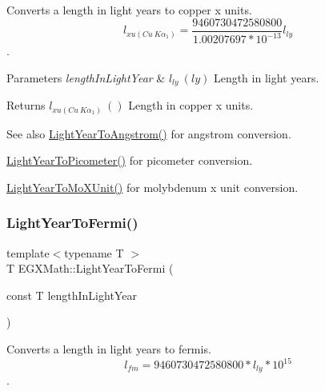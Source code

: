 Converts a length in light years to copper x units. \[ l_{xu(Cu\ K\alpha_1)}= \frac{9460730472580800}{1.00207697*10^{-13}} l_{ly}\]. 


\begin{DoxyParams}{Parameters}
{\em length\+In\+Light\+Year} & $ l_{ly}\ (ly)$ Length in light years. \\
\hline
\end{DoxyParams}
\begin{DoxyReturn}{Returns}
$ l_{xu(Cu\ K\alpha_1)}\ ()$ Length in copper x units. 
\end{DoxyReturn}
\begin{DoxySeeAlso}{See also}
\mbox{\hyperlink{group___e_g_x_math-_conversions-_length_conversions-_astronomical-_light_year-_non-_s_i_ga09634a7c514e3a0f573e7c171a791f78}{Light\+Year\+To\+Angstrom()}} for angstrom conversion. 

\mbox{\hyperlink{group___e_g_x_math-_conversions-_length_conversions-_astronomical-_light_year-_s_i_ga6dc5dc3c9584f578c4a935552fb965b7}{Light\+Year\+To\+Picometer()}} for picometer conversion. 

\mbox{\hyperlink{group___e_g_x_math-_conversions-_length_conversions-_astronomical-_light_year-_non-_s_i_gac275191181b93d118ec2b21cf09ff356}{Light\+Year\+To\+Mo\+X\+Unit()}} for molybdenum x unit conversion. 
\end{DoxySeeAlso}
\mbox{\label{group___e_g_x_math-_conversions-_length_conversions-_astronomical-_light_year-_non-_s_i_gaf3a2acd1e1653e2cecd6c299abe78524}} 
\subsubsection{\texorpdfstring{Light\+Year\+To\+Fermi()}{LightYearToFermi()}}
{\footnotesize\ttfamily template$<$typename T $>$ \\
T E\+G\+X\+Math\+::\+Light\+Year\+To\+Fermi (\begin{DoxyParamCaption}\item[{const T}]{length\+In\+Light\+Year }\end{DoxyParamCaption})}



Converts a length in light years to fermis. \[ l_{fm}=9460730472580800 * l_{ly} * 10^{15} \]. 


